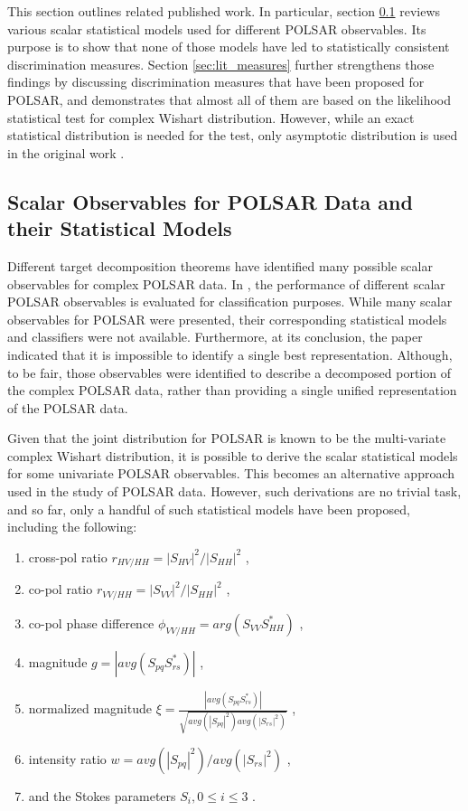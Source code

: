\documentclass[journal,12pt,draftcls,onecolumn]{IEEEtran}
\begin{document}
This section outlines related published work.
In particular, section \ref{sec:lit_models} reviews various scalar statistical models used for different POLSAR observables.
Its purpose is to show that none of those  models have led to statistically consistent discrimination measures. 
Section \ref{sec:lit_measures} further strengthens those findings by discussing discrimination measures that have been proposed for POLSAR,
  and demonstrates that almost all of them are based on the likelihood statistical test for complex Wishart distribution.
However, while an exact statistical distribution is needed for the test,
  only asymptotic distribution is used in the original work \cite{Conradsen_2003_TGRS_4}.
  
\subsection{Scalar Observables for POLSAR Data and their Statistical Models}
\label{sec:lit_models}

Different target decomposition theorems have identified many possible scalar observables for complex POLSAR data.
In \cite{Alberga_2008_IJRS_4129}, the performance of different scalar POLSAR observables is evaluated for classification purposes.
While many scalar observables for POLSAR were presented, their corresponding statistical models and classifiers were not available.
Furthermore, at its conclusion, the paper indicated that it is impossible to identify a single best representation.
Although, to be fair, those observables were identified to describe a decomposed portion of the complex POLSAR data,
  rather than providing a single unified representation of the POLSAR data.

Given that the joint distribution for POLSAR is known to be the multi-variate complex Wishart distribution,
  it is possible to derive the scalar statistical models for some univariate POLSAR observables.
This becomes an alternative approach used in the study of POLSAR data.
However, such derivations are no trivial task, and so far, only a handful of such statistical models have been proposed, including the following:
  \begin{enumerate}
  \item cross-pol ratio $r_{HV/HH} = |S_{HV}|^2/|S_{HH}|^2$ \cite{Joughin_1994_TGRS_562},
  \item co-pol ratio $r_{VV/HH} = |S_{VV}|^2/|S_{HH}|^2$ \cite{Joughin_1994_TGRS_562},
  \item co-pol phase difference $\phi_{VV/HH} = arg(S_{VV}S_{HH}^*) $ \cite{Joughin_1994_TGRS_562} \cite{Lee_1994_TGRS_1017},
  \item magnitude $g=|avg(S_{pq}S_{rs}^*)|$ \cite{Lee_1994_TGRS_1017},
  \item normalized magnitude $\xi = \frac{|avg(S_{pq}S_{rs}^*)|}{\sqrt{avg(|S_{pq}|^2) avg(|S_{rs}|^2)}}$ \cite{Lee_1994_TGRS_1017},
  \item intensity ratio $w = avg(|S_{pq}|^2)/avg(|S_{rs}|^2)$ \cite{Lee_1994_TGRS_1017},
  \item and the Stokes parameters $S_i,0 \leq i \leq 3$ \cite{Touzi_1996_TGRS_519}. 
  \end{enumerate}
\end{document}
